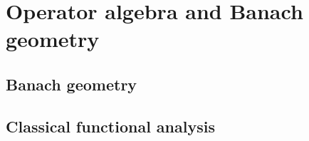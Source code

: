     \part{Operator algebra and Banach geometry}
        \chapter{Banach geometry}
            \begin{abstract}
                
            \end{abstract}
            
            \minitoc
            
            
            
            
            
            
        
    \begin{appendices}
        \chapter{Classical functional analysis}
            \begin{abstract}
            
            \end{abstract}
            
            \minitoc
            
            
            
            
    \end{appendices}
	
	\printbibliography

